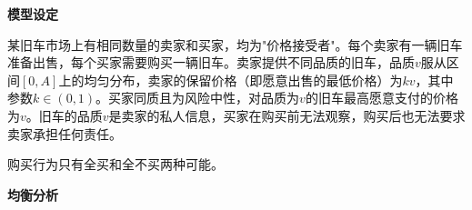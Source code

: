 
\noindent\textbf{模型设定}

某旧车市场上有相同数量的卖家和买家，均为"价格接受者"。每个卖家有一辆旧车准备出售，每个买家需要购买一辆旧车。卖家提供不同品质的旧车，品质$v$服从区间$[0,A]$上的均匀分布，卖家的保留价格（即愿意出售的最低价格）为$kv$，其中参数$k\in(0,1)$。买家同质且为风险中性，对品质为$v$的旧车最高愿意支付的价格为$v$。旧车的品质$v$是卖家的私人信息，买家在购买前无法观察，购买后也无法要求卖家承担任何责任。

购买行为只有全买和全不买两种可能。

\noindent\textbf{均衡分析}